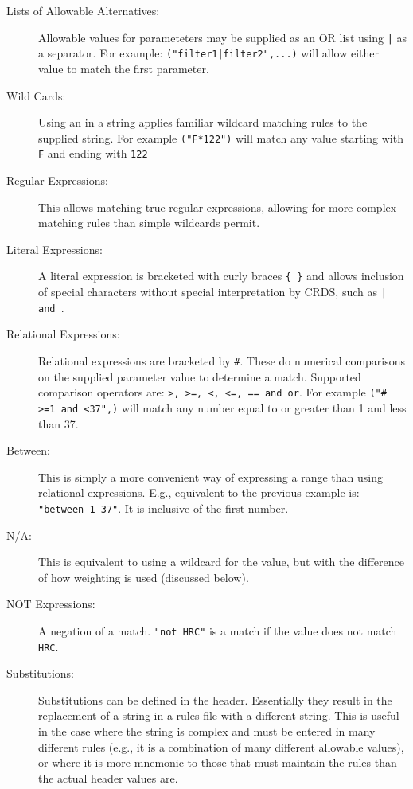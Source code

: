 \documentclass[final,authoryear,5p,times,twocolumn]{elsarticle}
\begin{document}
\begin{description}
\item[Lists of Allowable Alternatives:] Allowable values for parameteters
may be supplied as an \textquotesingle OR\textquotesingle
{\tt }list using {\tt |} as a separator. For example:
\texttt {({\ttfamily"}filter1|filter2{\ttfamily"},...)} will allow either value to match the first
parameter.
\item[Wild Cards:] Using an {\tt *} in a string applies familiar wildcard 
matching rules to the supplied string. For example 
\texttt {({\ttfamily"}F*122{\ttfamily"})} will
match any value starting with {\tt F} and ending with {\tt 122}
\item[Regular Expressions:] This allows matching true regular expressions,
allowing for more complex matching rules than simple wildcards permit.
\item[Literal Expressions:] A literal expression is bracketed with curly
braces {\tt \{ \}} and allows inclusion of special characters without 
special interpretation by CRDS, such as {\tt | and \*}.
\item[Relational Expressions:] Relational expressions are bracketed by {\tt \#}.
These do numerical comparisons on the supplied parameter value to determine
a match. Supported comparison operators are: 
\texttt {\textgreater, \textgreater =, \textless, \textless =, == and or}. 
For example \texttt {({\ttfamily"}\# >=1 and <37",)} 
will match any number equal to or 
greater than 1 and less than 37.
\item[Between:] This is simply a more convenient way of expressing a range
than using relational expressions. E.g., equivalent to the previous example
is: \texttt{{\ttfamily"}between 1 37{\ttfamily"}}. It is inclusive of the first number.
\item[N/A:] This is equivalent to using a wildcard for the value, but with 
the difference of how weighting is used (discussed below). 
\item[NOT Expressions:] A negation of a match. 
\texttt {{\ttfamily"}not HRC{\ttfamily"}} 
is a match if the value does not match {\tt HRC}.
\item[Substitutions:] Substitutions can be defined in the header. Essentially
they result in the replacement of a string in a rules file with a different
string. This is useful in the case where the string is complex and must be 
entered in many different rules (e.g., it is a combination of many different 
allowable values), or where it is more mnemonic to those that must maintain
the rules than the actual header values are.
\end{description}
\end{document}
